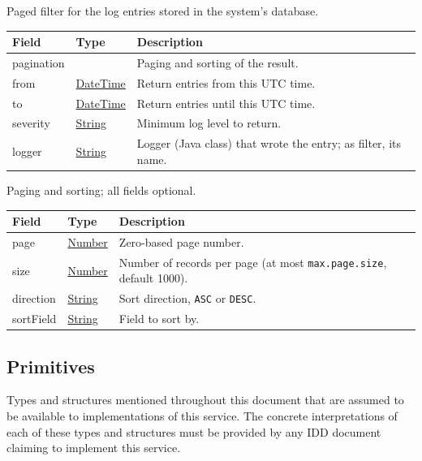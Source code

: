 \documentclass[a4paper]{arrowhead}
\newcommand{\mref}[2][]{{\textcolor{ArrowheadPurple}{\hyperref[sec:model:#2]{\ifstrempty{#1}{#2}{#1}}}}}
\newcommand{\pref}[1]{{\textcolor{ArrowheadGrey}{\hyperref[sec:model:primitives:#1]{#1}}}}
\begin{document}

Paged filter for the log entries stored in the system's database.


\noindent\begin{tabularx}{\textwidth}{| >{\raggedright\arraybackslash}p{3.9cm} | >{\raggedright\arraybackslash\small}p{5.3cm} | X |} \hline
\rowcolor{gray!33} Field & Type & Description \\ \hline
pagination & \mref{Page} & Paging and sorting of the result. \\ \hline
from & \pref{DateTime} & Return entries from this UTC time. \\ \hline
to & \pref{DateTime} & Return entries until this UTC time. \\ \hline
severity & \pref{String} & Minimum log level to return. \\ \hline
logger & \pref{String} & Logger (Java class) that wrote the entry; as filter, its name. \\ \hline
\end{tabularx}




Paging and sorting; all fields optional.


\noindent\begin{tabularx}{\textwidth}{| >{\raggedright\arraybackslash}p{3.9cm} | >{\raggedright\arraybackslash\small}p{5.3cm} | X |} \hline
\rowcolor{gray!33} Field & Type & Description \\ \hline
page & \pref{Number} & Zero-based page number. \\ \hline
size & \pref{Number} & Number of records per page (at most \texttt{max.\allowbreak{}page.\allowbreak{}size}, default 1000). \\ \hline
direction & \pref{String} & Sort direction, \texttt{ASC} or \texttt{DESC}. \\ \hline
sort\allowbreak{}Field & \pref{String} & Field to sort by. \\ \hline
\end{tabularx}



\subsection{Primitives}
\label{sec:model:primitives}

Types and structures mentioned throughout this document that are assumed to be available to implementations of this service.
The concrete interpretations of each of these types and structures must be provided by any IDD document claiming to implement this service.
\end{document}
